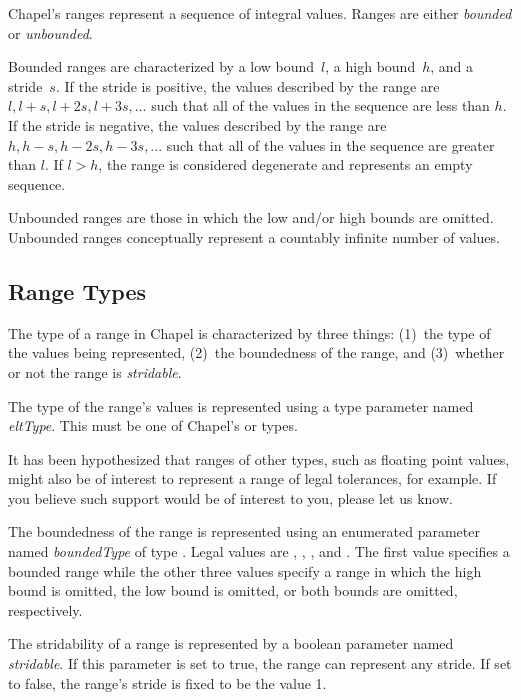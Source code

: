 \label{Ranges}

Chapel's ranges represent a sequence of integral values.  Ranges are
either \emph{bounded} or \emph{unbounded}.

Bounded ranges are characterized by a low bound~$l$, a high bound~$h$,
and a stride~$s$.  If the stride is positive, the values described by
the range are $l, l+s, l+2s, l+3s, ...$ such that all of the values in
the sequence are less than $h$.  If the stride is negative, the values
described by the range are $h, h-s, h-2s, h-3s, ...$ such that all of
the values in the sequence are greater than $l$.  If $l > h$, the
range is considered degenerate and represents an empty sequence.

Unbounded ranges are those in which the low and/or high bounds are
omitted.  Unbounded ranges conceptually represent a countably infinite
number of values.

\subsection{Range Types}


The type of a range in Chapel is characterized by three things:
(1)~the type of the values being represented, (2)~the boundedness of
the range, and (3)~whether or not the range is \emph{stridable}.

The type of the range's values is represented using a type parameter
named \emph{eltType}.  This must be one of Chapel's  or
 types.

\begin{openissue}
It has been hypothesized that ranges of other types, such as floating
point values, might also be of interest to represent a range of legal
tolerances, for example.  If you believe such support would be of
interest to you, please let us know.
\end{openissue}

The boundedness of the range is represented using an enumerated
parameter named \emph{boundedType} of type .
Legal values are , ,
, and .  The first value specifies
a bounded range while the other three values specify a range in which
the high bound is omitted, the low bound is omitted, or both bounds
are omitted, respectively.

The stridability of a range is represented by a boolean parameter
named \emph{stridable}.  If this parameter is set to true, the range
can represent any stride.  If set to false, the range's stride is
fixed to be the value 1.

